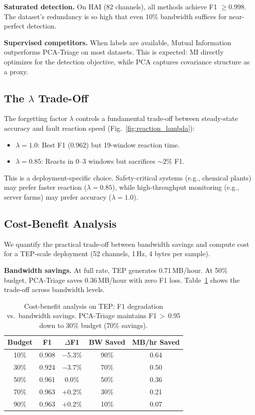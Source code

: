 \documentclass[journal]{IEEEtran}
\begin{document}
\textbf{Saturated detection.} On HAI (82 channels), all methods achieve F1 $\geq 0.998$. The dataset's redundancy is so high that even 10\% bandwidth suffices for near-perfect detection.

\textbf{Supervised competitors.} When labels are available, Mutual Information outperforms PCA-Triage on most datasets. This is expected: MI directly optimizes for the detection objective, while PCA captures covariance structure as a proxy.

\subsection{The $\lambda$ Trade-Off}

The forgetting factor $\lambda$ controls a fundamental trade-off between steady-state accuracy and fault reaction speed (Fig.~\ref{fig:reaction_lambda}):
\begin{itemize}[leftmargin=*]
\item $\lambda = 1.0$: Best F1 (0.962) but 19-window reaction time.
\item $\lambda = 0.85$: Reacts in 0--3 windows but sacrifices ${\sim}2\%$ F1.
\end{itemize}
This is a deployment-specific choice. Safety-critical systems (e.g., chemical plants) may prefer faster reaction ($\lambda = 0.85$), while high-throughput monitoring (e.g., server farms) may prefer accuracy ($\lambda = 1.0$).

\subsection{Cost-Benefit Analysis}

We quantify the practical trade-off between bandwidth savings and compute cost for a TEP-scale deployment (52 channels, 1\,Hz, 4 bytes per sample).

\textbf{Bandwidth savings.} At full rate, TEP generates 0.71\,MB/hour. At 50\% budget, PCA-Triage saves 0.36\,MB/hour with zero F1 loss. Table~\ref{tab:costbenefit} shows the trade-off across bandwidth levels.

\begin{table}[t]
\centering
\caption{Cost-benefit analysis on TEP: F1 degradation vs.\ bandwidth savings. PCA-Triage maintains F1\,$>$\,0.95 down to 30\% budget (70\% savings).}
\begin{tabular}{@{}ccccc@{}}
\toprule
\textbf{Budget} & \textbf{F1} & \textbf{$\Delta$F1} & \textbf{BW Saved} & \textbf{MB/hr Saved} \\
\midrule
10\% & 0.908 & $-$5.3\% & 90\% & 0.64 \\
30\% & 0.924 & $-$3.7\% & 70\% & 0.50 \\
50\% & 0.961 & 0.0\% & 50\% & 0.36 \\
70\% & 0.963 & $+$0.2\% & 30\% & 0.21 \\
90\% & 0.963 & $+$0.2\% & 10\% & 0.07 \\
\bottomrule
\end{tabular}
\label{tab:costbenefit}
\end{table}
\end{document}
